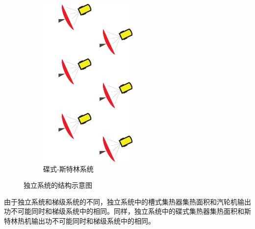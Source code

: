 \begin{figure}[htbp]
\begin{subfigure}[b]{0.26\columnwidth}
	\includegraphics[width = \columnwidth]{fig/Dish-s}
	\caption{碟式-斯特林系统}\label{fig:DishStirling}
	\end{subfigure}
	
	\caption{独立系统的结构示意图}\label{fig:Stand-alone-systems}
\end{figure}

	由于独立系统和梯级系统的不同，独立系统中的槽式集热器集热面积和汽轮机输出功不可能同时和梯级系统中的相同。同样，独立系统中的碟式集热器集热面积和斯特林热机输出功不可能同时和梯级系统中的相同。
	
